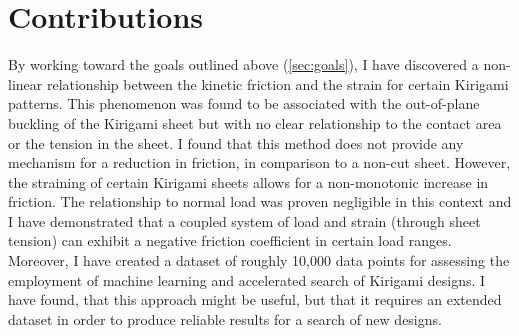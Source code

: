 \section{Contributions}
By working toward the goals outlined above (\cref{sec:goals}), I have
discovered a non-linear relationship between the kinetic friction and the strain
for certain Kirigami patterns. This phenomenon was found to be associated with
the out-of-plane buckling of the Kirigami sheet but with no clear relationship
to the contact area or the tension in the sheet. I found that this method does
not provide any mechanism for a reduction in friction, in comparison to a
non-cut sheet. However, the straining of certain Kirigami sheets allows for a
non-monotonic increase in friction. The relationship to normal load was proven
negligible in this context and I have demonstrated that a coupled system of load
and strain (through sheet tension) can exhibit a negative friction coefficient
in certain load ranges. Moreover, I have created a dataset of roughly 10,000
data points for assessing the employment of machine learning and accelerated
search of Kirigami designs. I have found, that this approach might be useful,
but that it requires an extended dataset in order to produce reliable results for a
search of new designs.


